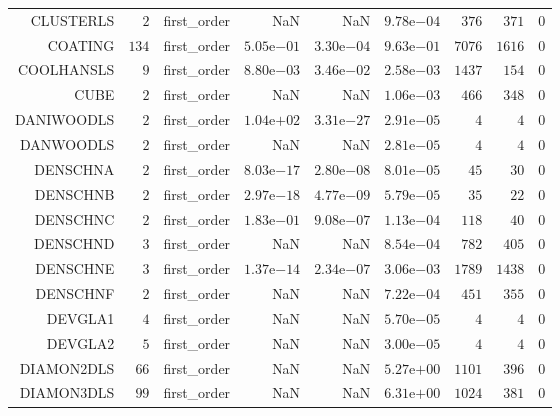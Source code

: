 \begin{longtable}{rrrrrrrrr}
CLUSTERLS & \(     2\) & first\_order &       NaN &       NaN & \( 9.78\)e\(-04\) & \(   376\) & \(   371\) & \(     0\) \\
COATING & \(   134\) & first\_order & \( 5.05\)e\(-01\) & \( 3.30\)e\(-04\) & \( 9.63\)e\(-01\) & \(  7076\) & \(  1616\) & \(     0\) \\
COOLHANSLS & \(     9\) & first\_order & \( 8.80\)e\(-03\) & \( 3.46\)e\(-02\) & \( 2.58\)e\(-03\) & \(  1437\) & \(   154\) & \(     0\) \\
CUBE & \(     2\) & first\_order &       NaN &       NaN & \( 1.06\)e\(-03\) & \(   466\) & \(   348\) & \(     0\) \\
DANIWOODLS & \(     2\) & first\_order & \( 1.04\)e\(+02\) & \( 3.31\)e\(-27\) & \( 2.91\)e\(-05\) & \(     4\) & \(     4\) & \(     0\) \\
DANWOODLS & \(     2\) & first\_order &       NaN &       NaN & \( 2.81\)e\(-05\) & \(     4\) & \(     4\) & \(     0\) \\
DENSCHNA & \(     2\) & first\_order & \( 8.03\)e\(-17\) & \( 2.80\)e\(-08\) & \( 8.01\)e\(-05\) & \(    45\) & \(    30\) & \(     0\) \\
DENSCHNB & \(     2\) & first\_order & \( 2.97\)e\(-18\) & \( 4.77\)e\(-09\) & \( 5.79\)e\(-05\) & \(    35\) & \(    22\) & \(     0\) \\
DENSCHNC & \(     2\) & first\_order & \( 1.83\)e\(-01\) & \( 9.08\)e\(-07\) & \( 1.13\)e\(-04\) & \(   118\) & \(    40\) & \(     0\) \\
DENSCHND & \(     3\) & first\_order &       NaN &       NaN & \( 8.54\)e\(-04\) & \(   782\) & \(   405\) & \(     0\) \\
DENSCHNE & \(     3\) & first\_order & \( 1.37\)e\(-14\) & \( 2.34\)e\(-07\) & \( 3.06\)e\(-03\) & \(  1789\) & \(  1438\) & \(     0\) \\
DENSCHNF & \(     2\) & first\_order &       NaN &       NaN & \( 7.22\)e\(-04\) & \(   451\) & \(   355\) & \(     0\) \\
DEVGLA1 & \(     4\) & first\_order &       NaN &       NaN & \( 5.70\)e\(-05\) & \(     4\) & \(     4\) & \(     0\) \\
DEVGLA2 & \(     5\) & first\_order &       NaN &       NaN & \( 3.00\)e\(-05\) & \(     4\) & \(     4\) & \(     0\) \\
DIAMON2DLS & \(    66\) & first\_order &       NaN &       NaN & \( 5.27\)e\(+00\) & \(  1101\) & \(   396\) & \(     0\) \\
DIAMON3DLS & \(    99\) & first\_order &       NaN &       NaN & \( 6.31\)e\(+00\) & \(  1024\) & \(   381\) & \(     0\) \\

\end{longtable}
